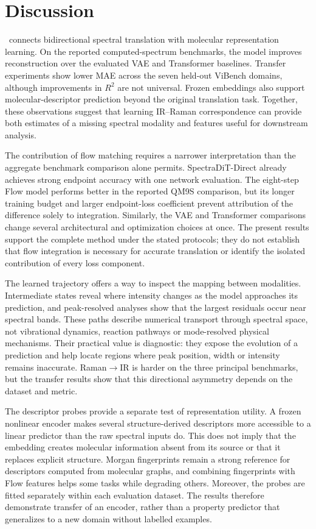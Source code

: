 \section*{Discussion}

\mname\ connects bidirectional spectral translation with molecular representation learning. On the reported computed-spectrum benchmarks, the model improves reconstruction over the evaluated VAE and Transformer baselines. Transfer experiments show lower MAE across the seven held-out ViBench domains, although improvements in $R^2$ are not universal. Frozen embeddings also support molecular-descriptor prediction beyond the original translation task. Together, these observations suggest that learning IR--Raman correspondence can provide both estimates of a missing spectral modality and features useful for downstream analysis.

The contribution of flow matching requires a narrower interpretation than the aggregate benchmark comparison alone permits. SpectraDiT-Direct already achieves strong endpoint accuracy with one network evaluation. The eight-step Flow model performs better in the reported QM9S comparison, but its longer training budget and larger endpoint-loss coefficient prevent attribution of the difference solely to integration. Similarly, the VAE and Transformer comparisons change several architectural and optimization choices at once. The present results support the complete method under the stated protocols; they do not establish that flow integration is necessary for accurate translation or identify the isolated contribution of every loss component.

The learned trajectory offers a way to inspect the mapping between modalities. Intermediate states reveal where intensity changes as the model approaches its prediction, and peak-resolved analyses show that the largest residuals occur near spectral bands. These paths describe numerical transport through spectral space, not vibrational dynamics, reaction pathways or mode-resolved physical mechanisms. Their practical value is diagnostic: they expose the evolution of a prediction and help locate regions where peak position, width or intensity remains inaccurate. Raman$\rightarrow$IR is harder on the three principal benchmarks, but the transfer results show that this directional asymmetry depends on the dataset and metric.

The descriptor probes provide a separate test of representation utility. A frozen nonlinear encoder makes several structure-derived descriptors more accessible to a linear predictor than the raw spectral inputs do. This does not imply that the embedding creates molecular information absent from its source or that it replaces explicit structure. Morgan fingerprints remain a strong reference for descriptors computed from molecular graphs, and combining fingerprints with Flow features helps some tasks while degrading others. Moreover, the probes are fitted separately within each evaluation dataset. The results therefore demonstrate transfer of an encoder, rather than a property predictor that generalizes to a new domain without labelled examples.

